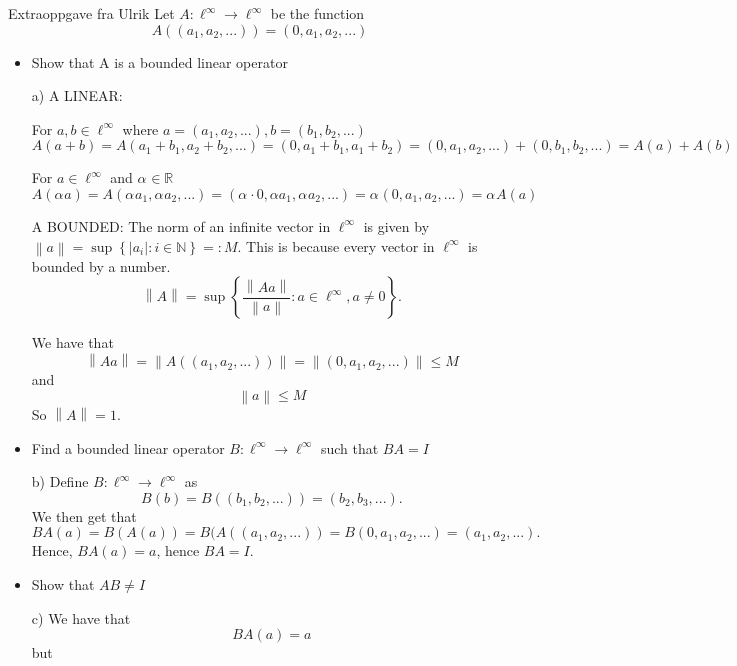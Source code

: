 \documentclass[a4paper,norsk]{article}
\renewcommand{\leq}{\leqslant}
\begin{document}
\begin{oppgavebox}{Extraoppgave fra Ulrik}{}
Let $ A : \ell ^{\infty} \to \ell ^{\infty}   $ be the function 
\[
    A \left( (a_1, a_2, ...) \right) = \left( 0, a_1, a_2, ... \right) 
\]
\begin{itemize}
    \item[a)] Show that A is a bounded linear operator
    \begin{proofbox}{a)}{}
        A LINEAR:

        For $ a, b \in \ell ^{\infty}  $ where $ a = \left( a_1, a_2, ... \right), b = \left( b_1, b_2, ... \right)   $  
        \[
            A \left( a + b \right) = A \left( a_1 + b_1, a_2 + b_2, ... \right) = \left( 0, a_1 + b_1, a_1 + b_2 \right) =   \left( 0, a_1, a_2, ... \right)  + \left(0, b_1, b_2, ... \right) = A(a) + A(b) 
        \]

        For $ a \in \ell ^{\infty}  $ and $ \alpha_{}^{} \in  \mathbb{R} $ 
        \[
            A \left( \alpha_{}^{} a \right) = A\left( \alpha_{}^{} a_1, \alpha_{}^{} a_2, ... \right) = \left( \alpha_{}^{} \cdot 0, \alpha a_1, \alpha_{}^{} a_2, ...  \right)  = \alpha_{}^{} \left(0,  a_1, a_2, ... \right) = \alpha_{}^{} A(a)
        \]
        

        A BOUNDED:
        The norm of an infinite vector in $ \ell ^{\infty}  $  is given by $ \left\lVert a \right\rVert = \sup \left\{ \left| a_i \right| : i \in \mathbb{N} \right\} =: M  $. This is because every vector in $ \ell ^{\infty}  $ is bounded by a number.
        \[
            \left\lVert A \right\rVert = \sup \left\{ \frac{ \left\lVert A a \right\rVert  }{ \left\lVert a \right\rVert  } : a \in \ell ^{\infty}, a \neq 0  \right\}.
        \]

        We have that
        \[
            \left\lVert Aa \right\rVert = \left\lVert A \left( \left( a_1, a_2, ... \right)  \right)  \right\rVert = \left\lVert \left( 0, a_1, a_2, ... \right)  \right\rVert \leq M
        \]
        and 
        \[
            \left\lVert a \right\rVert \leq M
        \]
        So $ \left\lVert A \right\rVert = 1 $.
    \end{proofbox}
    \item[b)] Find a bounded linear operator $ B : \ell ^{\infty} \to \ell ^{\infty}   $  such that $ BA = I $
    \begin{proofbox}{b)}{}
        Define $ B : \ell  ^{\infty} \to \ell ^{\infty}   $ as
        \[
            B \left( b \right) = B \left( \left( b_1, b_2, ... \right)  \right) = \left( b_2, b_3, ... \right).
        \]
        We then get that
        \[
            BA(a) = B(A(a)) = B(A( \left( a_1, a_2, ... \right)) = B(0, a_1, a_2, ...) = \left( a_1, a_2, ... \right).
        \]
        Hence, $ BA(a) = a $, hence $ BA = I $.
    \end{proofbox}
    \item[c)] Show that $ AB \neq I $   
    \begin{proofbox}{c)}{}
        We have that
        \[
            BA(a) = a
        \]
        but 


\end{proofbox}
\end{itemize}
\end{oppgavebox}
\end{document}
